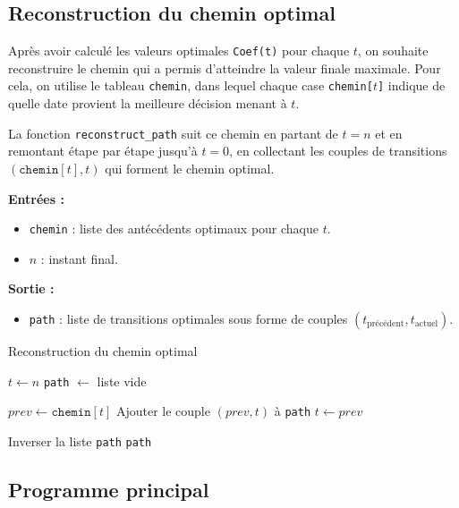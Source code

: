 \documentclass[a4paper,11pt]{article}
\begin{document}
\subsection{Reconstruction du chemin optimal}

Après avoir calculé les valeurs optimales \texttt{Coef(t)} pour chaque $t$, on souhaite reconstruire le chemin qui a permis d’atteindre la valeur finale maximale.  
Pour cela, on utilise le tableau \texttt{chemin}, dans lequel chaque case \texttt{chemin[$t$]} indique de quelle date provient la meilleure décision menant à $t$.

La fonction \texttt{reconstruct\_path} suit ce chemin en partant de $t = n$ et en remontant étape par étape jusqu’à $t = 0$, en collectant les couples de transitions $(\texttt{chemin}[t], t)$ qui forment le chemin optimal.

\vspace{0.3cm}

\noindent \textbf{Entrées :}
\begin{itemize}
	\item \texttt{chemin} : liste des antécédents optimaux pour chaque $t$.
	\item $n$ : instant final.
\end{itemize}

\noindent \textbf{Sortie :}
\begin{itemize}
	\item \texttt{path} : liste de transitions optimales sous forme de couples $(t_\text{précédent}, t_\text{actuel})$.
\end{itemize}

\begin{algorithm}[H]
	\caption{Reconstruction du chemin optimal}
	\begin{algorithmic}[1]
		\State $t \gets n$
		\State \texttt{path} $\gets$ liste vide
		
		\State $prev \gets \texttt{chemin}[t]$
		\State Ajouter le couple $(prev, t)$ à \texttt{path}
		\State $t \gets prev$
		\EndWhile
		
		\State Inverser la liste \texttt{path} 
		\State \Return \texttt{path}
		\EndFunction
	\end{algorithmic}
\end{algorithm}



\subsection{Programme principal}
\end{document}
